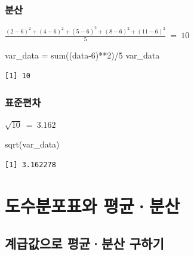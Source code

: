 \documentclass[
  letterpaper,
  DIV=11,
  numbers=noendperiod]{scrreprt}
\newenvironment{Shaded}{\begin{snugshade}}{\end{snugshade}}
\newcommand{\DecValTok}[1]{\textcolor[rgb]{0.68,0.00,0.00}{#1}}
\newcommand{\FunctionTok}[1]{\textcolor[rgb]{0.28,0.35,0.67}{#1}}
\newcommand{\NormalTok}[1]{\textcolor[rgb]{0.00,0.23,0.31}{#1}}
\newcommand{\OtherTok}[1]{\textcolor[rgb]{0.00,0.23,0.31}{#1}}
\newcommand{\SpecialCharTok}[1]{\textcolor[rgb]{0.37,0.37,0.37}{#1}}
\begin{document}
\hypertarget{uxbd84uxc0b0-1}{%
\subsection{분산}\label{uxbd84uxc0b0-1}}

\(\frac{(2-6)^2+(4-6)^2+(5-6)^2+(8-6)^2+(11-6)^2}{5}\ =\ 10\)

\begin{Shaded}
\begin{Highlighting}[]
\NormalTok{var\_data }\OtherTok{=} \FunctionTok{sum}\NormalTok{((data}\DecValTok{{-}6}\NormalTok{)}\SpecialCharTok{**}\DecValTok{2}\NormalTok{)}\SpecialCharTok{/}\DecValTok{5}
\NormalTok{var\_data}
\end{Highlighting}
\end{Shaded}

\begin{verbatim}
[1] 10
\end{verbatim}

\hypertarget{uxd45cuxc900uxd3b8uxcc28-1}{%
\subsection{표준편차}\label{uxd45cuxc900uxd3b8uxcc28-1}}

\(\sqrt{10}\ =\ 3.162\)

\begin{Shaded}
\begin{Highlighting}[]
\FunctionTok{sqrt}\NormalTok{(var\_data)}
\end{Highlighting}
\end{Shaded}

\begin{verbatim}
[1] 3.162278
\end{verbatim}

\hypertarget{uxb3c4uxc218uxbd84uxd3ecuxd45cuxc640-uxd3c9uxade0uxbd84uxc0b0}{%
\chapter{도수분포표와
평균·분산}\label{uxb3c4uxc218uxbd84uxd3ecuxd45cuxc640-uxd3c9uxade0uxbd84uxc0b0}}

\hypertarget{uxacc4uxae09uxac12uxc73cuxb85c-uxd3c9uxade0uxbd84uxc0b0-uxad6cuxd558uxae30}{%
\section{계급값으로 평균·분산
구하기}\label{uxacc4uxae09uxac12uxc73cuxb85c-uxd3c9uxade0uxbd84uxc0b0-uxad6cuxd558uxae30}}
\end{document}

